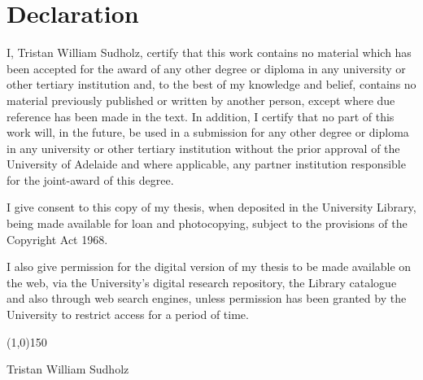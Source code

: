 \chapter*{Declaration}

I, Tristan William Sudholz, certify that this work contains no material which has been accepted for the award of any other 
degree or diploma in any university or other tertiary institution and, to the best of my knowledge and
belief, contains no material previously published or written by another person, except where due
reference has been made in the text. In addition, I certify that no part of this work will, in the future,
be used in a submission for any other degree or diploma in any university or other tertiary institution 
without the prior approval of the University of Adelaide and where applicable, any partner institution
responsible for the joint-award of this degree.

I give consent to this copy of my thesis, when deposited in the University Library, being made
available for loan and photocopying, subject to the provisions of the Copyright Act 1968.

I also give permission for the digital version of my thesis to be made available on the web, via the
University’s digital research repository, the Library catalogue and also through web search engines,
unless permission has been granted by the University to restrict access for a period of time. 

\vspace{2cm}

\line(1,0){150}

\vspace{1cm}

Tristan William Sudholz